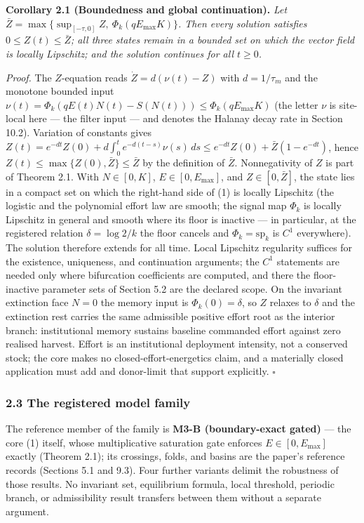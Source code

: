 \documentclass[11pt]{article}
\begin{document}
\textbf{Corollary 2.1 (Boundedness and global continuation).} \emph{Let
\(\bar Z = \max\{ \sup_{[-\tau,0]} Z,\ \Phi_k(qE_{\max}K) \}\). Then
every solution satisfies \(0 \le Z(t) \le \bar Z\); all three states
remain in a bounded set on which the vector field is locally Lipschitz;
and the solution continues for all \(t \ge 0\).}

\emph{Proof.} The \(Z\)-equation reads \(\dot Z = d(\nu(t) - Z)\) with
\(d = 1/\tau_m\) and the monotone bounded input
\(\nu(t) = \Phi_k(qE(t)N(t) - S(N(t))) \le \Phi_k(qE_{\max}K)\) (the
letter \(\nu\) is site-local here --- the filter input --- and denotes
the Halanay decay rate in Section 10.2). Variation of constants gives
\(Z(t) = e^{-dt}Z(0) + d\int_0^t e^{-d(t-s)}\nu(s)\,ds \le e^{-dt}Z(0) + \bar Z(1 - e^{-dt})\),
hence \(Z(t) \le \max\{Z(0), \bar Z\} \le \bar Z\) by the definition of
\(\bar Z\). Nonnegativity of \(Z\) is part of Theorem 2.1. With
\(N \in [0,K]\), \(E \in [0, E_{\max}]\), and \(Z \in [0, \bar Z]\), the
state lies in a compact set on which the right-hand side of (1) is
locally Lipschitz (the logistic and the polynomial effort law are
smooth; the signal map \(\Phi_k\) is locally Lipschitz in general and
smooth where its floor is inactive --- in particular, at the registered
relation \(\delta = \log 2 / k\) the floor cancels and
\(\Phi_k = \mathrm{sp}_k\) is \(C^1\) everywhere). The solution
therefore extends for all time. Local Lipschitz regularity suffices for
the existence, uniqueness, and continuation arguments; the \(C^1\)
statements are needed only where bifurcation coefficients are computed,
and there the floor-inactive parameter sets of Section 5.2 are the
declared scope. On the invariant extinction face \(N = 0\) the memory
input is \(\Phi_k(0) = \delta\), so \(Z\) relaxes to \(\delta\) and the
extinction rest carries the same admissible positive effort root as the
interior branch: institutional memory sustains baseline commanded effort
against zero realised harvest. Effort is an institutional deployment
intensity, not a conserved stock; the core makes no
closed-effort-energetics claim, and a materially closed application must
add and donor-limit that support explicitly. \ensuremath{\square}

\subsubsection{2.3 The registered model
family}\label{the-registered-model-family}

The reference member of the family is \textbf{M3-B (boundary-exact
gated)} --- the core (1) itself, whose multiplicative saturation gate
enforces \(E \in [0, E_{\max}]\) exactly (Theorem 2.1); its crossings,
folds, and basins are the paper's reference records (Sections 5.1 and
9.3). Four further variants delimit the robustness of those results. No
invariant set, equilibrium formula, local threshold, periodic branch, or
admissibility result transfers between them without a separate argument.
\end{document}
